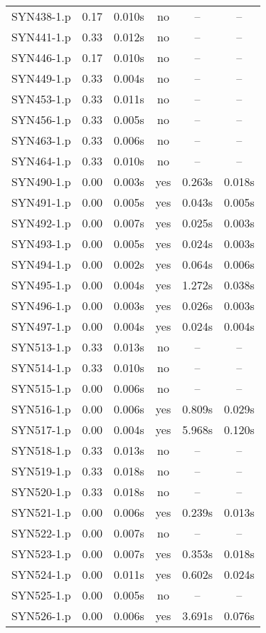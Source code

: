 \begin{center}
\begin{longtable}{||c | c | c | c | c | c||}
SYN438-1.p & 0.17 & 0.010s & no & -- & -- \\
SYN441-1.p & 0.33 & 0.012s & no & -- & -- \\
SYN446-1.p & 0.17 & 0.010s & no & -- & -- \\
SYN449-1.p & 0.33 & 0.004s & no & -- & -- \\
SYN453-1.p & 0.33 & 0.011s & no & -- & -- \\
SYN456-1.p & 0.33 & 0.005s & no & -- & -- \\
SYN463-1.p & 0.33 & 0.006s & no & -- & -- \\
SYN464-1.p & 0.33 & 0.010s & no & -- & -- \\
SYN490-1.p & 0.00 & 0.003s & yes & 0.263s & 0.018s \\
SYN491-1.p & 0.00 & 0.005s & yes & 0.043s & 0.005s \\
SYN492-1.p & 0.00 & 0.007s & yes & 0.025s & 0.003s \\
SYN493-1.p & 0.00 & 0.005s & yes & 0.024s & 0.003s \\
SYN494-1.p & 0.00 & 0.002s & yes & 0.064s & 0.006s \\
SYN495-1.p & 0.00 & 0.004s & yes & 1.272s & 0.038s \\
SYN496-1.p & 0.00 & 0.003s & yes & 0.026s & 0.003s \\
SYN497-1.p & 0.00 & 0.004s & yes & 0.024s & 0.004s \\
SYN513-1.p & 0.33 & 0.013s & no & -- & -- \\
SYN514-1.p & 0.33 & 0.010s & no & -- & -- \\
SYN515-1.p & 0.00 & 0.006s & no & -- & -- \\
SYN516-1.p & 0.00 & 0.006s & yes & 0.809s & 0.029s \\
SYN517-1.p & 0.00 & 0.004s & yes & 5.968s & 0.120s \\
SYN518-1.p & 0.33 & 0.013s & no & -- & -- \\
SYN519-1.p & 0.33 & 0.018s & no & -- & -- \\
SYN520-1.p & 0.33 & 0.018s & no & -- & -- \\
SYN521-1.p & 0.00 & 0.006s & yes & 0.239s & 0.013s \\
SYN522-1.p & 0.00 & 0.007s & no & -- & -- \\
SYN523-1.p & 0.00 & 0.007s & yes & 0.353s & 0.018s \\
SYN524-1.p & 0.00 & 0.011s & yes & 0.602s & 0.024s \\
SYN525-1.p & 0.00 & 0.005s & no & -- & -- \\
SYN526-1.p & 0.00 & 0.006s & yes & 3.691s & 0.076s \\

\end{longtable}
\end{center}
